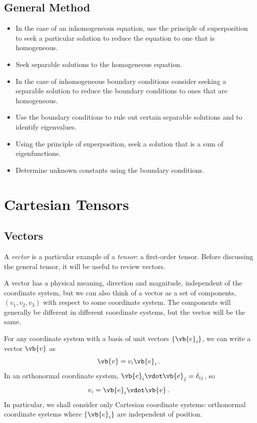 \documentclass{article}
\theoremstyle{plain}\theoremheaderfont{\normalfont\itshape}\theorembodyfont{\rmfamily}\theoremseparator{.}\newtheorem*{rem}{Remark}\newtheorem*{ex}{Example}\newtheorem*{proof}{Proof}\newtheorem*{altp}{Alternative proof}
\theoremstyle{plain}\theoremheaderfont{\normalfont\bfseries}\theorembodyfont{\rmfamily}\theoremseparator{.}\newtheorem{thm}{Theorem}[section]\newtheorem{lem}[thm]{Lemma}\newtheorem{prop}[thm]{Proposition}\newtheorem*{cor}{Corollary}\newtheorem{defn}[thm]{Definition}\newtheorem{clm}[thm]{Claim}\newtheorem{clminproof}{Claim}
\theoremstyle{break}\theoremheaderfont{\normalfont\itshape}\theorembodyfont{\rmfamily}\theoremseparator{.\medskip}\newtheorem*{proofskip}{Proof}\newtheorem*{exs}{Examples}\newtheorem*{rems}{Remarks}
\theoremstyle{break}\theoremheaderfont{\normalfont\bfseries}\theorembodyfont{\rmfamily}\theoremseparator{.\medskip}\newtheorem{lemskip}[thm]{Lemma}\newtheorem{defnskip}[thm]{Definition}\newtheorem{propskip}[thm]{Proposition}\newtheorem{thmskip}[thm]{Theorem}
\numberwithin{equation}{section}
\begin{document}
	\subsection{General Method}
	\begin{itemize}
		\item In the case of an inhomogeneous equation, use the principle of superposition to seek a particular solution to reduce the equation to one that is homogeneous.
		\item Seek separable solutions to the homogeneous equation.
		\item In the case of inhomogeneous boundary conditions consider seeking a separable solution to reduce the boundary conditions to ones that are homogeneous.
		\item Use the boundary conditions to rule out certain separable solutions and to identify eigenvalues.
		\item Using the principle of superposition, seek a solution that is a sum of eigenfunctions.
		\item Determine unknown constants using the boundary conditions.
	\end{itemize}
	
	\newpage

	\section{Cartesian Tensors}
	\subsection{Vectors}
	A \textit{vector} is a particular example of a \textit{tensor}: a first-order tensor. Before discussing the general tensor, it will be useful to review vectors.

	A vector has a physical meaning, direction and magnitude, independent of the coordinate system, but we can also think of a vector as a set of components, \((v_1,v_2,v_3)\) with respect to some coordinate system. The components will generally be different in different coordinate systems, but the vector will be the same.

	For any coordinate system with a basis of unit vectors \(\{\vb{e}_i\}\), we can write a vector \(\vb{v}\) as
	\[\vb{v}=v_i\vb{e}_i\,.\]
	In an orthonormal coordinate system, \(\vb{e}_i\vdot\vb{e}_j=\delta_{ij}\), so
	\[v_i=\vb{e}_i\vdot\vb{v}\,.\]
	In particular, we shall consider only Cartesian coordinate systems: orthonormal coordinate systems where \(\{\vb{e}_i\}\) are independent of position.
\end{document}
